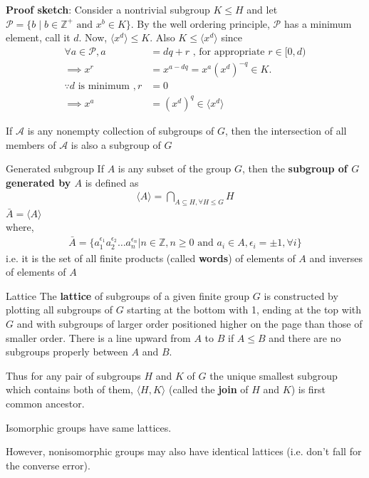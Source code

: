 \documentclass[titlepage, 12pt]{book}
\begin{document}
\textbf{Proof sketch}: Consider a nontrivial subgroup $K\leq H$ and let\newline
$\mathcal{P} = \{b\;|\;b\in\mathbb{Z^+}\textrm{ and } x^b\in K\}$. By the well
ordering principle, $\mathcal{P}$ has a minimum element, call it $d$. Now,
$\langle x^d\rangle\leq K$. Also $K\leq\langle x^d\rangle$ since
\begin{align*}
    \forall a\in\mathcal{P}, a &= dq+r\textrm{ , for appropriate $r\in [0, d)$}\\
    \implies x^r &= x^{a-dq} = x^a (x^d)^{-q}\in K.\\
    \because d\textrm{ is minimum }, r &= 0\\
    \implies x^a &= (x^d)^q \in \langle x^d\rangle
\end{align*}

\begin{proposition}{}{}
    If $\mathcal{A}$ is any nonempty collection of subgroups of $G$, then
        the intersection of all members of $\mathcal{A}$ is also a subgroup of
        $G$
\end{proposition}
\begin{definition}{Generated subgroup}{}
    If $A$ is any subset of the group $G$, then the \textbf{subgroup of
        $G$ generated by $A$} is defined as
        \begin{gather*}
            \langle A\rangle = \bigcap_{A\subseteq H,\forall H\le G}H
        \end{gather*}
    $\bar{A} = \langle A\rangle$\\
        where,
        \begin{gather*}
            \bar{A} = \{a_1^{\epsilon_1}a_2^{\epsilon_2}\dots
                a_n^{\epsilon_n}|n\in\mathbb{Z}, n\ge 0\textrm{ and } a_i\in A,
            \epsilon_i = \pm 1, \forall i\}
        \end{gather*}
        i.e. it is the set of all finite products (called \textbf{words}) of
        elements of $A$ and inverses of elements of $A$
\end{definition}
\begin{definition}{Lattice}{}
    The \textbf{lattice} of subgroups of a given finite group $G$ is constructed
    by plotting all subgroups of $G$ starting at the bottom with 1, ending at
    the top with $G$ and with subgroups of larger order positioned higher on the
    page than those of smaller order. There is a line upward from $A$ to $B$ if
    $A\le B$ and there are no subgroups properly between $A$ and $B$.
\end{definition}
Thus for any pair of subgroups $H$ and $K$ of $G$ the unique smallest subgroup
which contains both of them, $\langle H, K\rangle$ (called the \textbf{join} of
$H$ and $K$) is first common ancestor.
\begin{proposition}{}{}
    Isomorphic groups have same lattices.
\end{proposition}
However, nonisomorphic groups may also have identical lattices (i.e. don't fall
for the converse error).
\end{document}
